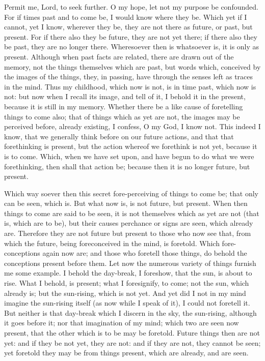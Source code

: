 \documentclass[b5paper,openright,12pt,twoside]{book}
\begin{document}
Permit me, Lord, to seek further. O my hope, let not my purpose be
confounded. For if times past and to come be, I would know where they
be. Which yet if I cannot, yet I know, wherever they be, they are not
there as future, or past, but present. For if there also they be future,
they are not yet there; if there also they be past, they are no longer
there. Wheresoever then is whatsoever is, it is only as present.
Although when past facts are related, there are drawn out of the memory,
not the things themselves which are past, but words which, conceived by
the images of the things, they, in passing, have through the senses left
as traces in the mind. Thus my childhood, which now is not, is in time
past, which now is not: but now when I recall its image, and tell of it,
I behold it in the present, because it is still in my memory. Whether
there be a like cause of foretelling things to come also; that of
things which as yet are not, the images may be perceived before, already
existing, I confess, O my God, I know not. This indeed I know, that we
generally think before on our future actions, and that that forethinking
is present, but the action whereof we forethink is not yet, because it
is to come. Which, when we have set upon, and have begun to do what
we were forethinking, then shall that action be; because then it is no
longer future, but present.

Which way soever then this secret fore-perceiving of things to come be;
that only can be seen, which is. But what now is, is not future,
but present. When then things to come are said to be seen, it is not
themselves which as yet are not (that is, which are to be), but their
causes perchance or signs are seen, which already are. Therefore they
are not future but present to those who now see that, from which
the future, being foreconceived in the mind, is foretold. Which
fore-conceptions again now are; and those who foretell those things, do
behold the conceptions present before them. Let now the numerous variety
of things furnish me some example. I behold the day-break, I foreshow,
that the sun, is about to rise. What I behold, is present; what I
foresignify, to come; not the sun, which already is; but the sun-rising,
which is not yet. And yet did I not in my mind imagine the sun-rising
itself (as now while I speak of it), I could not foretell it. But
neither is that day-break which I discern in the sky, the sun-rising,
although it goes before it; nor that imagination of my mind; which two
are seen now present, that the other which is to be may be foretold.
Future things then are not yet: and if they be not yet, they are not:
and if they are not, they cannot be seen; yet foretold they may be from
things present, which are already, and are seen.
\end{document}
